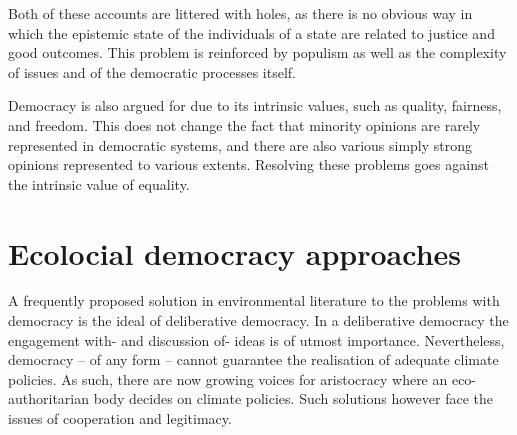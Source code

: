 \documentclass[12pt]{report}
\begin{document}
Both of these accounts are littered with holes, as there is no obvious way in
which the epistemic state of the individuals of a state are related to justice
and good outcomes. This problem is reinforced by populism as well as the
complexity of issues and of the democratic processes itself. 

Democracy is also argued for due to its intrinsic values, such as quality,
fairness, and freedom. This does not change the fact that minority opinions are
rarely represented in democratic systems, and there are also various simply
strong opinions represented to various extents. Resolving these problems goes
against the intrinsic value of equality.


\section{Ecolocial democracy approaches}

A frequently proposed solution in environmental literature to the problems with
democracy is the ideal of deliberative democracy. In a deliberative democracy
the engagement with- and discussion of- ideas is of utmost importance.
Nevertheless, democracy -- of any form -- cannot guarantee the realisation of
adequate climate policies. As such, there are now growing voices for aristocracy
where an eco-authoritarian body decides on climate policies. Such solutions
however face the issues of cooperation and legitimacy.
\end{document}
